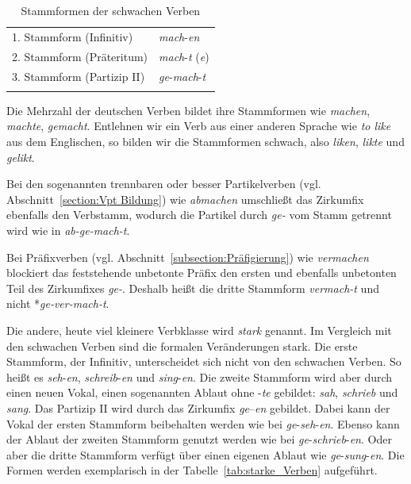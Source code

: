 \begin{table}
  \centering
  \begin{tabular}{l l}
    \lsptoprule
    1. Stammform (Infinitiv) & \textit{mach}-\textit{en} \\
    2. Stammform (Präteritum) & \textit{mach}-\textit{t} (\textit{e}) \\
    3. Stammform (Partizip II) & \textit{ge}-\textit{mach}-\textit{t} \\ 
    \lspbottomrule 
  \end{tabular}
  \caption{Stammformen der schwachen Verben}
  \label{tab:schwache_Verben}
\end{table}

Die Mehrzahl der deutschen Verben bildet ihre Stammformen wie \textit{machen}, \textit{machte}, \textit{gemacht}. Entlehnen wir ein Verb aus einer anderen Sprache wie \zB \textit{to like} aus dem Englischen, so bilden wir die Stammformen schwach, also \textit{liken}, \textit{likte} und \textit{gelikt}.

Bei den sogenannten trennbaren oder besser Partikelverben (vgl. Abschnitt~\ref{section:Vpt Bildung}) wie \textit{abmachen} umschließt das Zirkumfix ebenfalls den Verbstamm, wodurch die Partikel durch \textit{ge-} vom Stamm getrennt wird wie in \textit{ab-}\textit{ge-}\textit{mach}\textit{-t}. 

Bei Präfixverben (vgl. Abschnitt~\ref{subsection:Präfigierung}) wie \textit{vermachen} blockiert das feststehende unbetonte Präfix den ersten und ebenfalls unbetonten Teil des Zirkumfixes \textit{ge-}. Deshalb heißt die dritte Stammform \textit{vermach}\textit{-t} und nicht *\textit{ge-}\textit{ver-}\textit{mach}\textit{-t}.

Die andere, heute viel kleinere Verbklasse wird \textit{stark} genannt. Im Vergleich mit den schwachen Verben sind die formalen Veränderungen stark. Die erste Stammform, der Infinitiv, unterscheidet sich nicht von den schwachen Verben. So heißt es \zB \textit{seh}-\textit{en}, \textit{schreib}-\textit{en} und \textit{sing}-\textit{en}. Die zweite Stammform wird aber durch einen neuen Vokal, einen sogenannten Ablaut ohne -\textit{te} gebildet: \textit{sah}, \textit{schrieb} und \textit{sang}. Das Partizip II wird durch das Zirkumfix \textit{ge}--\textit{en} gebildet. Dabei kann der Vokal der ersten Stammform beibehalten werden wie bei \textit{ge}-\textit{seh}-\textit{en}. Ebenso kann der Ablaut der zweiten Stammform genutzt werden wie bei \textit{ge}-\textit{schrieb}-\textit{en}. Oder aber die dritte Stammform verfügt über einen eigenen Ablaut wie \textit{ge}-\textit{sung}-\textit{en}. Die Formen werden exemplarisch in der Tabelle~\ref{tab:starke_Verben} aufgeführt.


